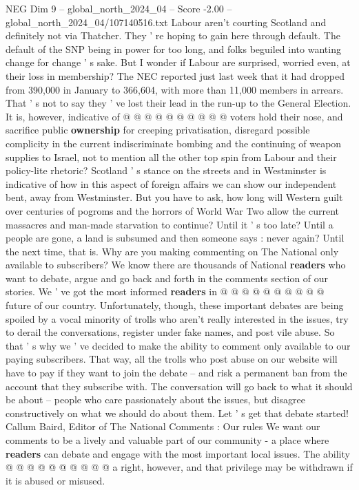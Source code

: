 \begin{textsample}{NEG Dim 9 – global\_north\_2024\_04 – Score -2.00 – global\_north\_2024\_04/107140516.txt}
Labour aren't courting Scotland and definitely not via Thatcher.
They ' re hoping to gain here through default.
The default of the SNP being in power for too long, and folks beguiled into wanting change for change ' s sake.
But I wonder if Labour are surprised, worried even, at their loss in membership?
The NEC reported just last week that it had dropped from 390,000 in January to 366,604, with more than 11,000 members in arrears.
That ' s not to say they ' ve lost their lead in the run-up to the General Election.
It is, however, indicative of @ @ @ @ @ @ @ @ @ @ voters hold their nose, and sacrifice public \textbf{ownership} for creeping privatisation, disregard possible complicity in the current indiscriminate bombing and the continuing of weapon supplies to Israel, not to mention all the other top spin from Labour and their policy-lite rhetoric?
Scotland ' s stance on the streets and in Westminster is indicative of how in this aspect of foreign affairs we can show our independent bent, away from Westminster.
But you have to ask, how long will Western guilt over centuries of pogroms and the horrors of World War Two allow the current massacres and man-made starvation to continue?
Until it ' s too late?
Until a people are gone, a land is subsumed and then someone says : never again?
Until the next time, that is.
Why are you making commenting on The National only available to subscribers?
We know there are thousands of National \textbf{readers} who want to debate, argue and go back and forth in the comments section of our stories.
We ' ve got the most informed \textbf{readers} in @ @ @ @ @ @ @ @ @ @ future of our country.
Unfortunately, though, these important debates are being spoiled by a vocal minority of trolls who aren't really interested in the issues, try to derail the conversations, register under fake names, and post vile abuse.
So that ' s why we ' ve decided to make the ability to comment only available to our paying subscribers.
That way, all the trolls who post abuse on our website will have to pay if they want to join the debate -- and risk a permanent ban from the account that they subscribe with.
The conversation will go back to what it should be about -- people who care passionately about the issues, but disagree constructively on what we should do about them.
Let ' s get that debate started!
Callum Baird, Editor of The National Comments : Our rules We want our comments to be a lively and valuable part of our community - a place where \textbf{readers} can debate and engage with the most important local issues.
The ability @ @ @ @ @ @ @ @ @ @ a right, however, and that privilege may be withdrawn if it is abused or misused.

\end{textsample}
